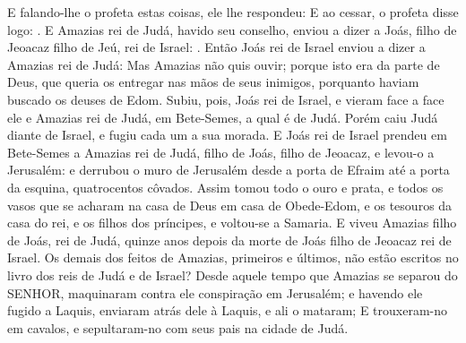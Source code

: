 {  E falando-lhe o profeta estas coisas, ele lhe respondeu:  E ao cessar, o profeta disse logo: .
  E Amazias rei de Judá, havido seu conselho, enviou a dizer a Joás, filho de Jeoacaz filho de Jeú, rei de Israel: .
  Então Joás rei de Israel enviou a dizer a Amazias rei de Judá: 
  Mas Amazias não quis ouvir; porque isto era da parte de Deus, que queria os entregar nas mãos de seus inimigos, porquanto haviam buscado os deuses de Edom. %
  Subiu, pois, Joás rei de Israel, e vieram face a face ele e Amazias rei de Judá, em Bete-Semes, a qual é de Judá.
  Porém caiu Judá diante de Israel, e fugiu cada um a sua morada.
  E Joás rei de Israel prendeu em Bete-Semes a Amazias rei de Judá, filho de Joás, filho de Jeoacaz, e levou-o a Jerusalém: e derrubou o muro de Jerusalém desde a porta de Efraim até a porta da esquina, quatrocentos côvados.
  Assim tomou todo o ouro e prata, e todos os vasos que se acharam na casa de Deus em casa de Obede-Edom, e os tesouros da casa do rei, e os filhos dos príncipes, e voltou-se a Samaria.
  E viveu Amazias filho de Joás, rei de Judá, quinze anos depois da morte de Joás filho de Jeoacaz rei de Israel.
  Os demais dos feitos de Amazias, primeiros e últimos, não estão escritos no livro dos reis de Judá e de Israel?
  Desde aquele tempo que Amazias se separou do SENHOR, maquinaram contra ele conspiração em Jerusalém; e havendo ele fugido a Laquis, enviaram atrás dele à Laquis, e ali o mataram; %
  E trouxeram-no em cavalos, e sepultaram-no com seus pais na cidade de Judá.
\par }

